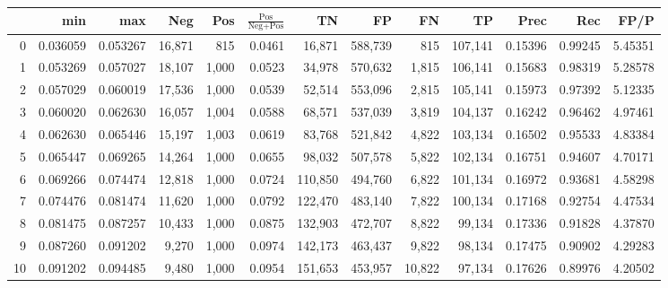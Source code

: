 \begin{tabular}{rrrrrrrrrrrrr}
\toprule
{} &       min &       max &     Neg &    Pos & $\frac{\text{Pos}}{\text{Neg}+\text{Pos}}$ &       TN &       FP &       FN &       TP &     Prec &      Rec &     FP/P \\
\midrule
0   &  0.036059 &  0.053267 &  16,871 &    815 &                                     0.0461 &   16,871 &  588,739 &      815 &  107,141 &  0.15396 &  0.99245 &  5.45351 \\
1   &  0.053269 &  0.057027 &  18,107 &  1,000 &                                     0.0523 &   34,978 &  570,632 &    1,815 &  106,141 &  0.15683 &  0.98319 &  5.28578 \\
2   &  0.057029 &  0.060019 &  17,536 &  1,000 &                                     0.0539 &   52,514 &  553,096 &    2,815 &  105,141 &  0.15973 &  0.97392 &  5.12335 \\
3   &  0.060020 &  0.062630 &  16,057 &  1,004 &                                     0.0588 &   68,571 &  537,039 &    3,819 &  104,137 &  0.16242 &  0.96462 &  4.97461 \\
4   &  0.062630 &  0.065446 &  15,197 &  1,003 &                                     0.0619 &   83,768 &  521,842 &    4,822 &  103,134 &  0.16502 &  0.95533 &  4.83384 \\
5   &  0.065447 &  0.069265 &  14,264 &  1,000 &                                     0.0655 &   98,032 &  507,578 &    5,822 &  102,134 &  0.16751 &  0.94607 &  4.70171 \\
6   &  0.069266 &  0.074474 &  12,818 &  1,000 &                                     0.0724 &  110,850 &  494,760 &    6,822 &  101,134 &  0.16972 &  0.93681 &  4.58298 \\
7   &  0.074476 &  0.081474 &  11,620 &  1,000 &                                     0.0792 &  122,470 &  483,140 &    7,822 &  100,134 &  0.17168 &  0.92754 &  4.47534 \\
8   &  0.081475 &  0.087257 &  10,433 &  1,000 &                                     0.0875 &  132,903 &  472,707 &    8,822 &   99,134 &  0.17336 &  0.91828 &  4.37870 \\
9   &  0.087260 &  0.091202 &   9,270 &  1,000 &                                     0.0974 &  142,173 &  463,437 &    9,822 &   98,134 &  0.17475 &  0.90902 &  4.29283 \\
10  &  0.091202 &  0.094485 &   9,480 &  1,000 &                                     0.0954 &  151,653 &  453,957 &   10,822 &   97,134 &  0.17626 &  0.89976 &  4.20502 \\

\end{tabular}
